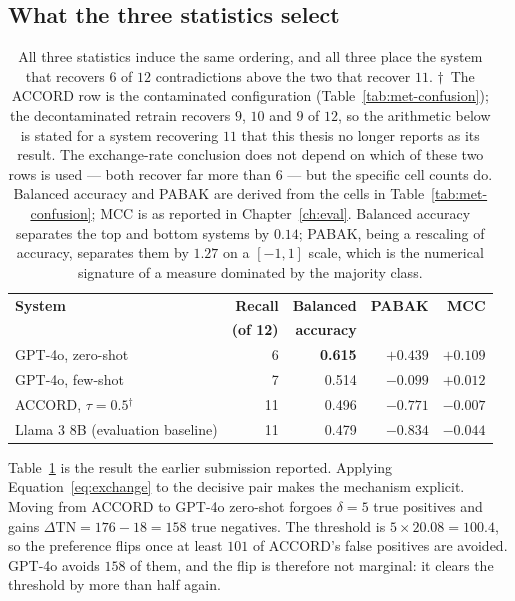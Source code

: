 \subsection{What the three statistics select}

\begin{table}[t]
\centering
\small
\begin{tabular}{lrrrr}
\toprule
\textbf{System} & \textbf{Recall} & \textbf{Balanced} & \textbf{PABAK} &
\textbf{MCC} \\
 & \textbf{(of 12)} & \textbf{accuracy} & & \\
\midrule
GPT-4o, zero-shot          & 6  & \textbf{0.615} & $\mathbf{+0.439}$ & $\mathbf{+0.109}$ \\
GPT-4o, few-shot           & 7  & 0.514          & $-0.099$          & $+0.012$ \\
ACCORD, $\tau = 0.5$$^{\dagger}$ & 11 & 0.496    & $-0.771$          & $-0.007$ \\
Llama 3 8B (evaluation baseline) & 11 & 0.479          & $-0.834$          & $-0.044$ \\
\bottomrule
\end{tabular}
\caption{All three statistics induce the same ordering, and all three place the
system that recovers $6$ of $12$ contradictions above the two that recover $11$.
$\dagger$~The ACCORD row is the contaminated configuration
(Table~\ref{tab:met-confusion}); the decontaminated retrain recovers $9$, $10$
and $9$ of $12$, so the arithmetic below is stated for a system recovering $11$
that this thesis no longer reports as its result. The exchange-rate conclusion
does not depend on which of these two rows is used --- both recover far more than
$6$ --- but the specific cell counts do.
Balanced accuracy and PABAK are derived from the cells in
Table~\ref{tab:met-confusion}; MCC is as reported in Chapter~\ref{ch:eval}.
Balanced accuracy separates the top and bottom systems by $0.14$; PABAK, being
a rescaling of accuracy, separates them by $1.27$ on a $[-1, 1]$ scale, which is
the numerical signature of a measure dominated by the majority class.}
\label{tab:met-selection}
\end{table}

Table~\ref{tab:met-selection} is the result the earlier submission reported.
Applying Equation~\eqref{eq:exchange} to the decisive pair makes the mechanism
explicit. Moving from ACCORD to GPT-4o zero-shot forgoes $\delta = 5$ true
positives and gains $\Delta\mathrm{TN} = 176 - 18 = 158$ true negatives. The
threshold is $5 \times 20.08 = 100.4$, so the preference flips once at least
$101$ of ACCORD's false positives are avoided. GPT-4o avoids $158$ of them, and
the flip is therefore not marginal: it clears the threshold by more than half
again.


